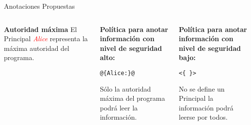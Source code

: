 \begin{frame}[fragile]{Anotaciones Propuestas}
\begin{columns}[T]

\column{2in}
\begin{mdframed}
\scriptsize{
\textbf{Autoridad máxima}\newline
El Principal \emph{\textcolor{red}{Alice}} representa la máxima autoridad del
programa.}
\end{mdframed}
\vspace{-0.5em}

\begin{mdframed}
\scriptsize{
\textbf{Política para anotar información con nivel de seguridad alto:}
\vspace{-0.5em}
\begin{lstlisting}[style=base2]
@{Alice:}@
\end{lstlisting}
\vspace{-0.5em}
Sólo la autoridad máxima del programa podrá leer la información. 
}
\end{mdframed}
\vspace{-0.5em}

\begin{mdframed}
\scriptsize{
\textbf{Política para anotar información con nivel de seguridad bajo:}
\vspace{-0.5em}
\begin{lstlisting}[style=base2]
<{ }>
\end{lstlisting}
\vspace{-0.5em}
No se define un Principal la información podrá leerse por todos. }
\end{mdframed}
\end{columns}
\end{frame}

